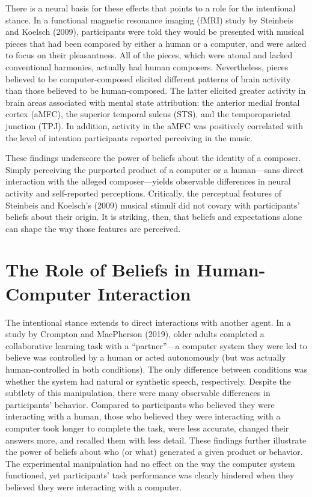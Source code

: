 \documentclass[12pt,twoside]{reedthesis}
\begin{document}
There is a neural basis for these effects that points to a role for the intentional stance. In a functional magnetic resonance imaging (fMRI) study by Steinbeis and Koelsch (2009), participants were told they would be presented with musical pieces that had been composed by either a human or a computer, and were asked to focus on their pleasantness. All of the pieces, which were atonal and lacked conventional harmonies, actually had human composers. Nevertheless, pieces believed to be computer-composed elicited different patterns of brain activity than those believed to be human-composed. The latter elicited greater activity in brain areas associated with mental state attribution: the anterior medial frontal cortex (aMFC), the superior temporal sulcus (STS), and the temporoparietal junction (TPJ). In addition, activity in the aMFC was positively correlated with the level of intention participants reported perceiving in the music. 

These findings underscore the power of beliefs about the identity of a composer. Simply perceiving the purported product of a computer or a human—sans direct interaction with the alleged composer—yields observable differences in neural activity and self-reported perceptions. Critically, the perceptual features of Steinbeis and Koelsch’s (2009) musical stimuli did not covary with participants’ beliefs about their origin. It is striking, then, that beliefs and expectations alone can shape the way those features are perceived. 

\section{The Role of Beliefs in Human-Computer Interaction
}

The intentional stance extends to direct interactions with another agent. In a study by Crompton and MacPherson (2019), older adults completed a collaborative learning task with a “partner”—a computer system they were led to believe was controlled by a human or acted autonomously (but was actually human-controlled in both conditions). The only difference between conditions was whether the system had natural or synthetic speech, respectively. Despite the subtlety of this manipulation, there were many observable differences in participants’ behavior. Compared to participants who believed they were interacting with a human, those who believed they were interacting with a computer took longer to complete the task, were less accurate, changed their answers more, and recalled them with less detail. These findings further illustrate the power of beliefs about who (or what) generated a given product or behavior. The experimental manipulation had no effect on the way the computer system functioned, yet participants’ task performance was clearly hindered when they believed they were interacting with a computer. 
\end{document}
